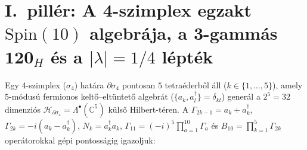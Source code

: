 \documentclass[11pt,a4paper]{article}
\begin{document}
\section{\texorpdfstring{I.\ pillér: A 4-szimplex egzakt $\mathrm{Spin}(10)$ algebrája, a 3-gammás $\mathbf{120}_H$ és a $|\lambda| = 1/4$ lépték}{I. pillér: A 4-szimplex egzakt Spin(10) algebrája, a 3-gammás 120\_H és a |lambda| = 1/4 lépték}}
Egy 4-szimplex ($\sigma_4$) határa $\partial\sigma_4$ pontosan $5$ tetraéderből áll ($k \in \{1,\dots,5\}$), amely $5$-módusú fermionos keltő--eltüntető algebrát ($\{a_k, a_l^\dagger\} = \delta_{kl}$) generál a $2^5 = 32$ dimenziós $\mathcal{H}_{\partial\sigma_4} = \Lambda^\bullet(\mathbb{C}^5)$ külső Hilbert-téren. A $\Gamma_{2k-1} = a_k + a_k^\dagger$, $\Gamma_{2k} = -i(a_k - a_k^\dagger)$, $N_k = a_k^\dagger a_k$, $\Gamma_{11} = (-i)^5 \prod_{a=1}^{10}\Gamma_a$ és $B_{10} = \prod_{k=1}^5 \Gamma_{2k}$ operátorokkal gépi pontosságig igazoljuk:
\end{document}
